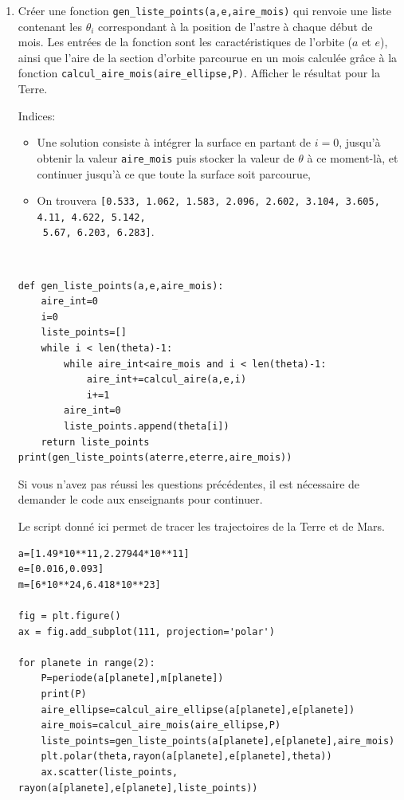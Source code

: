 \begin{enumerate}
\item Créer une fonction \verb?gen_liste_points(a,e,aire_mois)? qui renvoie une liste contenant les $\theta_i$ correspondant à la position de l'astre à chaque début de mois. Les entrées de la fonction sont les caractéristiques de l'orbite ($a$ et $e$), ainsi que l'aire de la section d'orbite parcourue en un mois calculée grâce à la fonction \verb?calcul_aire_mois(aire_ellipse,P)?. Afficher le résultat pour la Terre.

Indices:
\begin{itemize}
 \item Une solution consiste à intégrer la surface en partant de $i=0$, jusqu'à obtenir la valeur \verb?aire_mois? puis stocker la valeur de $\theta$ à ce moment-là, et continuer jusqu'à ce que toute la surface soit parcourue,
 \item On trouvera \verb?[0.533, 1.062, 1.583, 2.096, 2.602, 3.104, 3.605, 4.11, 4.622, 5.142,?\\
\verb? 5.67, 6.203, 6.283]?.
\end{itemize}

\begin{solution}~\ \\
\begin{verbatim}
def gen_liste_points(a,e,aire_mois):
    aire_int=0
    i=0
    liste_points=[]
    while i < len(theta)-1:
        while aire_int<aire_mois and i < len(theta)-1:
            aire_int+=calcul_aire(a,e,i)
            i+=1
        aire_int=0
        liste_points.append(theta[i])
    return liste_points
print(gen_liste_points(aterre,eterre,aire_mois))
\end{verbatim}
\end{solution}


Si vous n'avez pas réussi les questions précédentes, il est nécessaire de demander le code aux enseignants pour continuer.

Le script donné ici permet de tracer les trajectoires de la Terre et de Mars.
\begin{verbatim}
a=[1.49*10**11,2.27944*10**11]
e=[0.016,0.093]
m=[6*10**24,6.418*10**23]

fig = plt.figure()
ax = fig.add_subplot(111, projection='polar')

for planete in range(2):
    P=periode(a[planete],m[planete])
    print(P)
    aire_ellipse=calcul_aire_ellipse(a[planete],e[planete])
    aire_mois=calcul_aire_mois(aire_ellipse,P)
    liste_points=gen_liste_points(a[planete],e[planete],aire_mois)
    plt.polar(theta,rayon(a[planete],e[planete],theta))
    ax.scatter(liste_points, rayon(a[planete],e[planete],liste_points))


\end{verbatim}
\end{enumerate}
